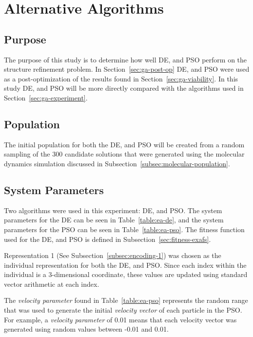 \section{Alternative Algorithms}

\subsection{Purpose}

The purpose of this study is to determine how well DE, and PSO perform on the structure refinement problem. In Section~\ref{sec:ga-post-op} DE, and PSO were used as a post-optimization of the results found in Section~\ref{sec:ga-viability}. In this study DE, and PSO will be more directly compared with the algorithms used in Section~\ref{sec:ga-experiment}.

\subsection{Population}

The initial population for both the DE, and PSO will be created from a random sampling of the 300 candidate solutions that were generated using the molecular dynamics simulation discussed in Subsection~\ref{subsec:molecular-population}.

\subsection{System Parameters}

Two algorithms were used in this experiment: DE, and PSO. The system parameters for the DE can be seen in Table~\ref{table:ea-de}, and the system parameters for the PSO can be seen in Table~\ref{table:ea-pso}. The fitness function used for the DE, and PSO is defined in Subsection~\ref{sec:fitness-exafs}.

Representation 1 (See Subsection~\ref{subsec:encoding-1}) was chosen as the individual representation for both the DE, and PSO. Since each index within the individual is a 3-dimensional coordinate, these values are updated using standard vector arithmetic at each index.

The \textit{velocity parameter} found in Table~\ref{table:ea-pso} represents the random range that was used to generate the initial \textit{velocity vector} of each particle in the PSO. For example, a \textit{velocity parameter} of 0.01 means that each velocity vector was generated using random values between -0.01 and 0.01.

